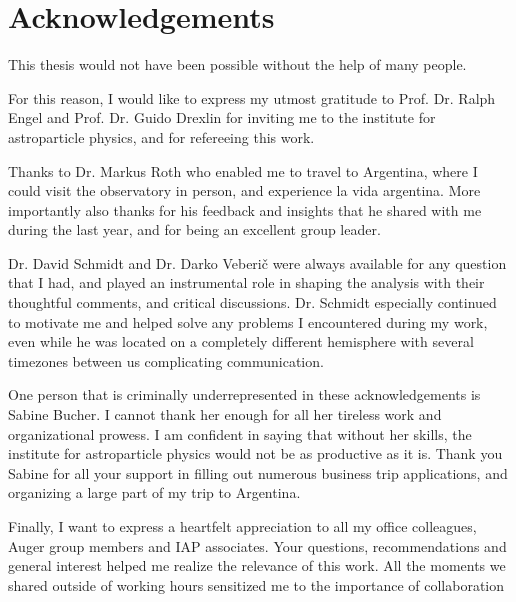 
\chapter*{Acknowledgements}

This thesis would not have been possible without the help of many people.

For this reason, I would like to express my utmost gratitude to Prof. Dr. Ralph Engel and Prof. Dr. Guido Drexlin for inviting me to the institute for 
astroparticle physics, and for refereeing this work.

Thanks to Dr. Markus Roth who enabled me to travel to Argentina, where I could visit the observatory in person, and experience la vida argentina. More importantly
also thanks for his feedback and insights that he shared with me during the last year, and for being an excellent group leader.

Dr. David Schmidt and Dr. Darko Veberi\v{c} were always available for any question that I had, and played an instrumental role in shaping the analysis with their
thoughtful comments, and critical discussions. Dr. Schmidt especially continued to motivate me and helped solve any problems I encountered during my work, even 
while he was located on a completely different hemisphere with several timezones between us complicating communication.

One person that is criminally underrepresented in these acknowledgements is Sabine Bucher. I cannot thank her enough for all her tireless work and organizational
prowess. I am confident in saying that without her skills, the institute for astroparticle physics would not be as productive as it is. Thank you Sabine for all
your support in filling out numerous business trip applications, and organizing a large part of my trip to Argentina.

Finally, I want to express a heartfelt appreciation to all my office colleagues, Auger group members and IAP associates. Your questions, recommendations and 
general interest helped me realize the relevance of this work. All the moments we shared outside of working hours sensitized me to the importance of collaboration
